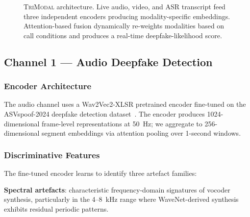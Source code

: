\documentclass[sigconf,nonacm]{acmart}
\begin{document}
\begin{figure}[t]
\caption{\textsc{TriModal} architecture. Live audio, video, and ASR
  transcript feed three independent encoders producing modality-specific
  embeddings. Attention-based fusion dynamically re-weights modalities
  based on call conditions and produces a real-time deepfake-likelihood
  score.}
\label{fig:framework}
\end{figure}

\subsection{Channel 1 --- Audio Deepfake Detection}

\subsubsection{Encoder Architecture}

The audio channel uses a Wav2Vec2-XLSR pretrained encoder fine-tuned on
the ASVspoof-2024 deepfake detection dataset~\cite{wang2024asvspoof,
tak2024aasist}. The encoder produces 1024-dimensional frame-level
representations at 50~Hz; we aggregate to 256-dimensional segment
embeddings via attention pooling over 1-second windows.

\subsubsection{Discriminative Features}

The fine-tuned encoder learns to identify three artefact families:

\textbf{Spectral artefacts}: characteristic frequency-domain signatures
of vocoder synthesis, particularly in the 4--8~kHz range where
WaveNet-derived synthesis exhibits residual periodic patterns.
\end{document}
